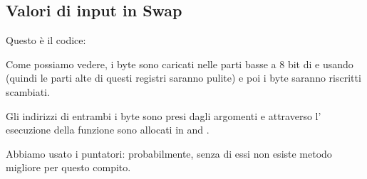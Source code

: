 \subsection{Valori di input in Swap}

Questo è il codice:



Come possiamo vedere, i byte sono caricati nelle parti basse a 8 bit di  e  usando 
(quindi le parti alte di questi registri saranno pulite) e poi i byte saranno riscritti scambiati.



Gli indirizzi di entrambi i byte sono presi dagli argomenti e attraverso l' esecuzione della funzione sono allocati in  and .

Abbiamo usato i puntatori: probabilmente, senza di essi non esiste metodo migliore per questo compito.


